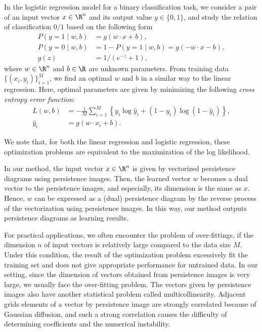 \documentclass[smallextended]{svjour3}
\begin{document}
In the logistic regression model for a binary classification task,
we consider a pair of an input vector $x \in \R^n$ and its output value $y\in\{0,1\}$, and study the relation of classification $0/1$ based on the following form
\begin{equation}
  \label{eq:logistic}
  \begin{aligned}
    P(y = 1 \mid w, b) &= g(w\cdot x + b), \\
    P(y = 0 \mid w, b) &= 1 - P(y=1 \mid w, b) = g(-w\cdot x - b), \\
    g(z) &= 1/(e^{-z}+1),
  \end{aligned}
\end{equation}
where $w \in \R^n$ and $b \in \R$ are unknown parameters.
From training data $\{(x_i, y_i)\}_{i=1}^M$, we find an optimal $w$ and
$b$ in a similar way to the linear regression. Here, optimal parameters are given
by minimizing the following \emph{cross entropy error function}:
\begin{equation}
  \label{eq:error-logistic-regression}
  \begin{aligned}
    L(w, b) &= -\frac{1}{M}
      \sum_{i=1}^M\left\{y_i \log \hat{y}_i + (1-y_i) \log (1 - \hat{y}_i) \right\},\\
    \hat{y}_i &= g(w \cdot x_i + b).
  \end{aligned}
\end{equation}

We note that, for both the linear regression and logistic regression, these optimization problems are equivalent to the maximization of the log likelihood. 

In our method, the input vector $x \in \R^n$ is given by vectorized persistence diagrams using persistence images. Then, the learned vector $w$ becomes a dual vector to the persistence images, and especially, its dimension  is the same as $x$. Hence, $w$ can be expressed as a (dual) persistence diagram by the reverse process of the vectorization using persistence images. In this way, our method outputs persistence diagrams as learning results. 

For practical applications, we often encounter the problem of
over-fittings, 
if the dimension $n$ of input vectors is relatively large compared to the data size $M$. 
Under this condition, the result of the optimization problem excessively fit the training set and does not give appropriate performance for untrained data. 
In our setting, since the dimension of vectors obtained from persistence images is very large, we usually face the over-fitting problem.
The vectors given by
persistence images also have another statistical problem called multicollinearity\citep{statistics}.
Adjacent grids elements of a vector by persistence image
are strongly correlated because of Gaussian diffusion, and such a strong correlation
causes the difficulty of determining coefficients and the numerical instability.
\end{document}
